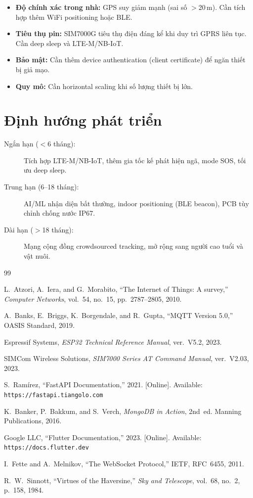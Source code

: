 \documentclass[13pt, a4paper]{report}
\begin{document}
\begin{itemize}
  \item \textbf{Độ chính xác trong nhà:} GPS suy giảm mạnh (sai số $>$20\,m). Cần tích hợp thêm WiFi positioning hoặc BLE.
  \item \textbf{Tiêu thụ pin:} SIM7000G tiêu thụ điện đáng kể khi duy trì GPRS liên tục. Cần deep sleep và LTE-M/NB-IoT.
  \item \textbf{Bảo mật:} Cần thêm device authentication (client certificate) để ngăn thiết bị giả mạo.
  \item \textbf{Quy mô:} Cần horizontal scaling khi số lượng thiết bị lớn.
\end{itemize}

\section{Định hướng phát triển}

\begin{description}
  \item[Ngắn hạn ($<$6 tháng):] Tích hợp LTE-M/NB-IoT, thêm gia tốc kế phát hiện ngã, mode SOS, tối ưu deep sleep.
  \item[Trung hạn (6--18 tháng):] AI/ML nhận diện bất thường, indoor positioning (BLE beacon), PCB tùy chỉnh chống nước IP67.
  \item[Dài hạn ($>$18 tháng):] Mạng cộng đồng crowdsourced tracking, mở rộng sang người cao tuổi và vật nuôi.
\end{description}

\begin{thebibliography}{99}

L.~Atzori, A.~Iera, and G.~Morabito,
``The Internet of Things: A survey,''
\textit{Computer Networks}, vol.~54, no.~15, pp.~2787--2805, 2010.

A.~Banks, E.~Briggs, K.~Borgendale, and R.~Gupta,
``MQTT Version 5.0,''
OASIS Standard, 2019.

Espressif Systems,
\textit{ESP32 Technical Reference Manual}, ver.~V5.2, 2023.

SIMCom Wireless Solutions,
\textit{SIM7000 Series AT Command Manual}, ver.~V2.03, 2023.

S.~Ramírez,
``FastAPI Documentation,''
2021. [Online]. Available: \texttt{https://fastapi.tiangolo.com}

K.~Banker, P.~Bakkum, and S.~Verch,
\textit{MongoDB in Action}, 2nd~ed.
Manning Publications, 2016.

Google LLC,
``Flutter Documentation,''
2023. [Online]. Available: \texttt{https://docs.flutter.dev}

I.~Fette and A.~Melnikov,
``The WebSocket Protocol,''
IETF, RFC~6455, 2011.

R.~W.~Sinnott,
``Virtues of the Haversine,''
\textit{Sky and Telescope}, vol.~68, no.~2, p.~158, 1984.

\end{thebibliography}
\end{document}
